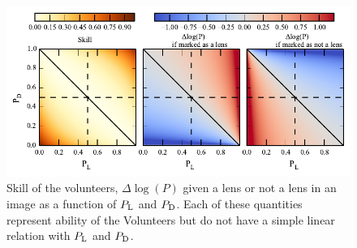\documentclass[useAMS,usenatbib,a4paper]{mn2e}
\begin{document}
\begin{figure}
\begin{center}
\includegraphics[scale=1.0]{sw-cfhtls-figs/dlnp_skill.pdf}
\caption{ \label{fig:skilldlnp}
Skill of the volunteers, $\Delta\log(P)$ given a lens or not a lens in
an image as a function of $P_{\rm L}$ and $P_{\rm D}$. Each of these
quantities represent ability of the Volunteers but do not have a simple
linear relation with $P_{\rm L}$ and $P_{\rm D}$.  
}
\end{center}
\end{figure}







% 


%




\label{lastpage}
\bsp
\end{document}
